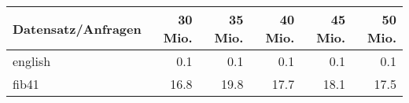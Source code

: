 \documentclass[10pt,a4paper]{standalone}
\begin{document}
\begin{tabular}{|l|r|r|r|r|r|}
\hline
Datensatz/Anfragen & 30 Mio. & 35 Mio. & 40 Mio. & 45 Mio. & 50 Mio.\\
\hline\hline
english & 0.1 & 0.1 & 0.1 & 0.1 & 0.1 \\
fib41 & 16.8 & 19.8 & 17.7 & 18.1 & 17.5 \\
\hline
\end{tabular}
\end{document}
